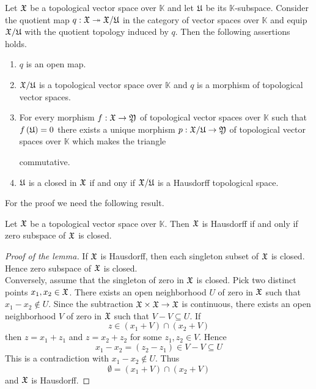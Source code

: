 \begin{theorem}\label{theorem:quotients_of_topological_vector_spaces}
Let ${\mathfrak X}$ be a topological vector space over $\mathbb{K}$ and let ${\mathfrak U}$ be its $\mathbb{K}$-subspace. Consider the quotient map $q:{\mathfrak X}\twoheadrightarrow {\mathfrak X}/{\mathfrak U}$ in the category of vector spaces over $\mathbb{K}$ and equip ${\mathfrak X}/{\mathfrak U}$ with the quotient topology induced by $q$. Then the following assertions holds.
\begin{enumerate}[label=\emph{\textbf{(\arabic*)}}, leftmargin=*]
\item $q$ is an open map.
\item ${\mathfrak X}/{\mathfrak U}$ is a topological vector space over $\mathbb{K}$ and $q$ is a morphism of topological vector spaces.
\item For every morphism $f:{\mathfrak X}\rightarrow {\mathfrak Y}$ of topological vector spaces over $\mathbb{K}$ such that $f\left({\mathfrak U}\right) = 0$ there exists a unique morphism $p:{\mathfrak X}/{\mathfrak U}\rightarrow {\mathfrak Y}$ of topological vector spaces over $\mathbb{K}$ which makes the triangle
\begin{center}
\end{center}
commutative.
\item ${\mathfrak U}$ is a closed in ${\mathfrak X}$ if and ony if ${\mathfrak X}/{\mathfrak U}$ is a Hausdorff topological space.
\end{enumerate}
\end{theorem}
\noindent
For the proof we need the following result.

\begin{lemma}\label{lemma:Hausdorff_topological_vector_spaces}
Let ${\mathfrak X}$ be a topological vector space over $\mathbb{K}$. Then ${\mathfrak X}$ is Hausdorff if and only if zero subspace of ${\mathfrak X}$ is closed.
\end{lemma}
\begin{proof}[Proof of the lemma]
If ${\mathfrak X}$ is Hausdorff, then each singleton subset of ${\mathfrak X}$ is closed. Hence zero subspace of ${\mathfrak X}$ is closed.\\
Conversely, assume that the singleton of zero in ${\mathfrak X}$ is closed. Pick two distinct points $x_1,x_2 \in {\mathfrak X}$. There exists an open neighborhood $U$ of zero in ${\mathfrak X}$ such that $x_1 - x_2\not \in U$. Since the subtraction ${\mathfrak X}\times {\mathfrak X}\rightarrow {\mathfrak X}$ is continuous, there exists an open neighborhood $V$ of zero in ${\mathfrak X}$ such that $V - V\subseteq U$. If
$$z \in (x_1 + V)\cap (x_2 + V)$$
then $z = x_1 + z_1$ and $z = x_2 + z_2$ for some $z_1,z_2 \in V$. Hence
$$x_1 - x_2 = (z_2 - z_1) \in V - V \subseteq U$$
This is a contradiction with $x_1 - x_2 \not \in U$. Thus
$$\emptyset = (x_1 + V)\cap (x_2 + V)$$
and ${\mathfrak X}$ is Hausdorff.  
\end{proof}

